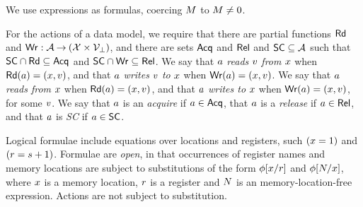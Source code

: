 We use expressions as formulas, coercing $M$ to $M\neq0$.

For the actions of a data model, we require that
  there are partial functions $\mathsf{Rd}$ and
  $\mathsf{Wr}: \mathcal{A} \mathbin\rightarrow (\mathcal{X} \times \mathcal{V}_\bot)$, and
  there are sets $\mathsf{Acq}$ and $\mathsf{Rel}$ and $\mathsf{SC} \subseteq\mathcal{A}$ such that
  $\mathsf{SC}\cap\mathsf{Rd}\subseteq\mathsf{Acq}$ and
  $\mathsf{SC}\cap\mathsf{Wr}\subseteq\mathsf{Rel}$. %
%
We say that $a$ \emph{reads} $v$ \emph{from} $x$ when
$\mathsf{Rd}(a) = (x,v)$, and that $a$ \emph{writes} $v$
\emph{to} $x$ when $\mathsf{Wr}(a) = (x,v)$.
We say that $a$ \emph{reads from} $x$ when
$\mathsf{Rd}(a) = (x,v)$, and that $a$ \emph{writes to}
$x$ when $\mathsf{Wr}(a) = (x,v)$, for some $v$. %
%
%
We say that $a$ is an \emph{acquire} if $a\in\mathsf{Acq}$, that $a$
is a \emph{release} if $a\in\mathsf{Rel}$, and that $a$ is \emph{SC} if $a\in\mathsf{SC}$.  



Logical formulae include equations over locations and registers, such
$(x=1)$ and $(r=s+1)$.  Formulae are \emph{open}, in that
occurrences of register names and memory locations are subject to
substitutions of the form $\phi[x/r]$ and $\phi[N/x]$,
where $x$ is a memory location, $r$ is a register and $N$ is an
memory-location-free expression.  Actions are not subject to substitution.


